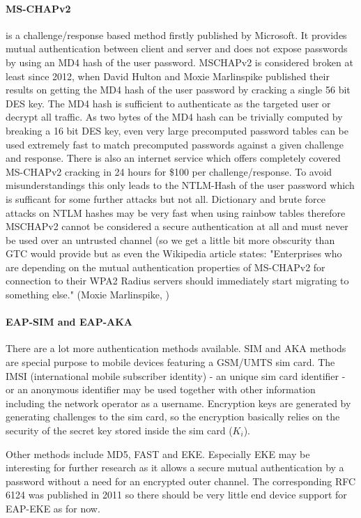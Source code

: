 \documentclass[12pt,a4paper]{scrartcl}
\begin{document}
\paragraph{MS-CHAPv2} is a challenge/response based method firstly published by Microsoft.
It provides mutual authentication between client and server and does not expose passwords by using an MD4 hash of the user password.
MSCHAPv2 is considered broken at least since 2012, when David Hulton and Moxie Marlinspike published their results on getting the MD4 hash of the user password by cracking a single 56 bit DES key.
The MD4 hash is sufficient to authenticate as the targeted user or decrypt all traffic.
As two bytes of the MD4 hash can be trivially computed by breaking a 16 bit DES key, even very large precomputed password tables can be used extremely fast to match precomputed passwords against a given challenge and response.
There is also an internet service which offers completely covered MS-CHAPv2 cracking in 24 hours for \$100 per challenge/response.
To avoid misunderstandings this only leads to the NTLM-Hash of the user password which is sufficant for some further attacks but not all.
Dictionary and brute force attacks on NTLM hashes may be very fast when using rainbow tables therefore MSCHAPv2 cannot be considered a secure authentication at all and must never be used over an untrusted channel (so we get a little bit more obscurity than GTC would provide but as even the Wikipedia article states: "Enterprises who are depending on the mutual authentication properties of MS-CHAPv2 for connection to their WPA2 Radius servers should immediately start migrating to something else." (Moxie Marlinspike, \cite{wiki-wpa})

\paragraph{EAP-SIM and EAP-AKA} 
There are a lot more authentication methods available.
SIM and AKA methods are special purpose to mobile devices featuring a GSM/UMTS sim card.
The IMSI (international mobile subscriber identity) - an unique sim card identifier - or an anonymous identifier may be used together with other information including the network operator as a username.
Encryption keys are generated by generating challenges to the sim card, so the encryption basically relies on the security of the secret key stored inside the sim card ($K_i$).

Other methods include MD5, FAST and EKE.
Especially EKE may be interesting for further research as it allows a secure mutual authentication by a password without a need for an encrypted outer channel.
The corresponding RFC 6124 was published in 2011 so there should be very little end device support for EAP-EKE as for now.
\end{document}
